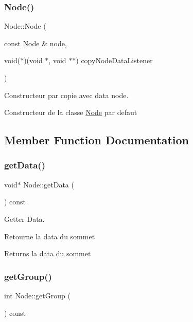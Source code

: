\subsubsection{\texorpdfstring{Node()}{Node()}\hspace{0.1cm}{\footnotesize\ttfamily [3/3]}}
{\footnotesize\ttfamily Node\+::\+Node (\begin{DoxyParamCaption}\item[{const \mbox{\hyperlink{class_node}{Node}} \&}]{node,  }\item[{void($\ast$)(void $\ast$, void $\ast$$\ast$)}]{copy\+Node\+Data\+Listener }\end{DoxyParamCaption})}



Constructeur par copie avec data node. 

Constructeur de la classe \mbox{\hyperlink{class_node}{Node}} par defaut 

\subsection{Member Function Documentation}
\mbox{\label{class_node_a56fd0bc1abfad73e9ac9561a0f20c23d}} 
\subsubsection{\texorpdfstring{get\+Data()}{getData()}}
{\footnotesize\ttfamily void$\ast$ Node\+::get\+Data (\begin{DoxyParamCaption}{ }\end{DoxyParamCaption}) const}



Getter Data. 

Retourne la data du sommet

\begin{DoxyReturn}{Returns}
la data du sommet 
\end{DoxyReturn}
\mbox{\label{class_node_a459e4ba8eb31ccc165d00110a6e4d9ae}} 
\subsubsection{\texorpdfstring{get\+Group()}{getGroup()}}
{\footnotesize\ttfamily int Node\+::get\+Group (\begin{DoxyParamCaption}{ }\end{DoxyParamCaption}) const}



